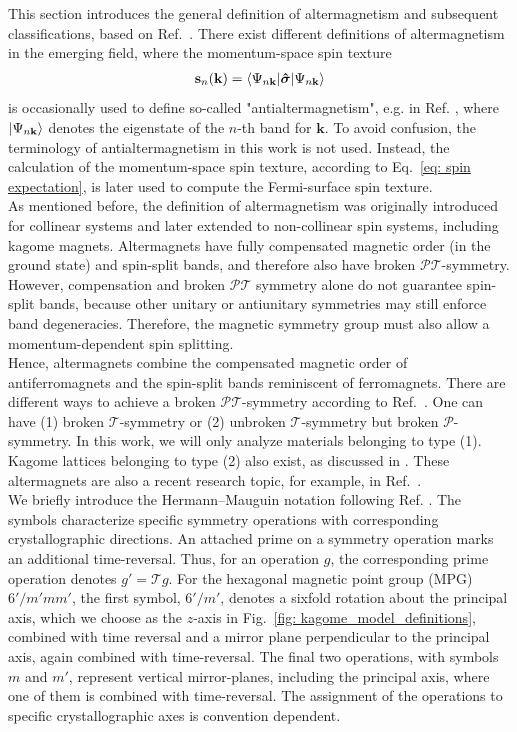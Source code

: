 This section introduces the general definition of altermagnetism and subsequent classifications, based on Ref.~\cite{Cheong2025}. There exist different definitions of altermagnetism in the emerging field, where the momentum-space spin texture 
\begin{align}
    \mathbf{s}_n(\mathbf{k}) = \langle \Psi_{n\mathbf{k}} \rvert \bm{\hat{\sigma}}\lvert \Psi_{n\mathbf{k}} \rangle
    \label{eq: spin expectation}
\end{align} 
is occasionally used to define so-called "antialtermagnetism", e.g. in Ref. \cite{JUNGWIRTH2025100162}, where $\lvert \Psi_{n\mathbf{k}} \rangle$ denotes the eigenstate of the $n$-th band for $\mathbf{k}$. To avoid confusion, the terminology of antialtermagnetism in this work is not used. Instead, the calculation of the momentum-space spin texture, according to Eq.~\eqref{eq: spin expectation}, is later used to compute the Fermi-surface spin texture.\\
As mentioned before, the definition of altermagnetism was originally introduced for collinear 
systems and later extended to non-collinear spin systems, including kagome magnets. 
Altermagnets have fully compensated magnetic order (in the ground state) and spin-split bands, and therefore also have broken $\mathcal{PT}$-symmetry. However, compensation and broken \(\mathcal{PT}\) symmetry alone do not guarantee spin-split bands, because other unitary or antiunitary symmetries may still enforce band degeneracies. Therefore, the magnetic symmetry group must also allow a momentum-dependent spin splitting. \\
Hence, altermagnets combine the compensated magnetic order of antiferromagnets and the spin-split bands reminiscent of ferromagnets.
There are different ways to achieve a broken $\mathcal{PT}$-symmetry according to Ref.~\cite{Cheong2025}. One can have (1) broken $\mathcal{T}$-symmetry or (2) unbroken $\mathcal{T}$-symmetry but broken $\mathcal{P}$-symmetry.
In this work, we will only analyze materials belonging to type (1). \\
Kagome lattices belonging to type (2) also exist, as discussed in \cite{Cheong2025}. These altermagnets are also a recent research topic, for example, in Ref.~\cite{Sah2026}. \\

We briefly introduce the Hermann–Mauguin notation following Ref. \cite{Hoffmann2020}. The symbols characterize specific symmetry operations with corresponding crystallographic directions. An attached prime on a symmetry operation marks an additional time-reversal. Thus, for an operation $g$, the corresponding prime operation denotes $g'= \mathcal{T}g$. 
For the hexagonal magnetic point group (MPG) $6'/m'mm'$, the first symbol, $6'/m'$, denotes a sixfold rotation about the principal axis, which we choose as the $z$-axis in Fig.~\ref{fig: kagome_model_definitions}, combined with time reversal and a mirror plane perpendicular to the principal axis, again combined with time-reversal. The final two operations, with symbols $m$ and $m'$, represent vertical mirror-planes, including the principal axis, where one of them is combined with time-reversal. 
The assignment of the operations to specific crystallographic axes is convention dependent.\\

